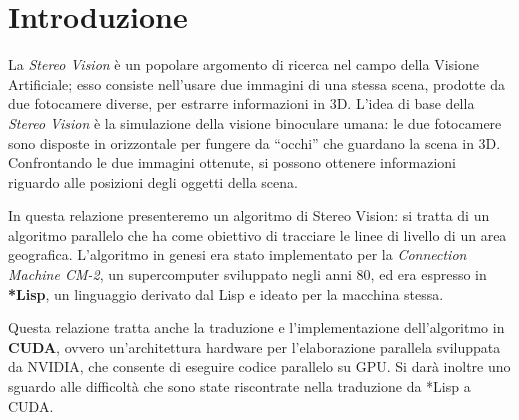 \documentclass[12pt,a4paper,openright,twoside]{report}
\begin{document}

\tableofcontents
\rhead[\fancyplain{}{\bfseries\leftmark}]{\fancyplain{}{\bfseries\thepage}}
\clearpage{\pagestyle{empty}\cleardoublepage}

\listoffigures
\clearpage{\pagestyle{empty}\cleardoublepage}






\chapter*{Introduzione}



La \textit{Stereo Vision} è un popolare argomento di ricerca nel campo della Visione Artificiale; esso consiste nell'usare due immagini di una stessa scena, prodotte da due fotocamere diverse, per estrarre informazioni in 3D. L'idea di base della \textit{Stereo Vision} è la simulazione della visione binoculare umana: le due fotocamere sono disposte in orizzontale per fungere da ``occhi'' che guardano la scena in 3D. Confrontando le due immagini ottenute, si possono ottenere informazioni riguardo alle posizioni degli oggetti della scena.

In questa relazione presenteremo un algoritmo di Stereo Vision: si tratta di un algoritmo parallelo che ha come obiettivo di tracciare le linee di livello di un area geografica. L'algoritmo in genesi era stato implementato per la \textit{Connection Machine CM-2}, un supercomputer sviluppato negli anni 80, ed era espresso in \textbf{*Lisp}, un linguaggio derivato dal Lisp e ideato per la macchina stessa.

Questa relazione tratta anche la traduzione e l'implementazione dell'algoritmo in \textbf{CUDA}, ovvero un'architettura hardware per l'elaborazione parallela sviluppata da NVIDIA, che consente di eseguire codice parallelo su GPU. Si darà inoltre uno sguardo alle difficoltà che sono state riscontrate nella traduzione da *Lisp a CUDA.
\end{document}
